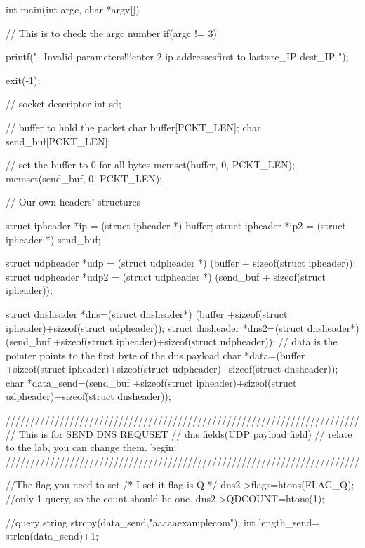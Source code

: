 \documentclass[a4paper,12pt]{article}
\begin{document}
		
		int main(int argc, char *argv[])
		{
		
		
		
		// This is to check the argc number
		    if(argc != 3){
		
		    	printf("- Invalid parameters!!!\nPlease enter 2 ip addresses\nFrom first to last:src_IP  dest_IP  \n");
		   
		    	exit(-1);
		
		    }
		
		
		// socket descriptor
		    int sd;
		
		// buffer to hold the packet
		    char buffer[PCKT_LEN];
		    char send_buf[PCKT_LEN];
		
		// set the buffer to 0 for all bytes
		    memset(buffer, 0, PCKT_LEN);
		    memset(send_buf, 0, PCKT_LEN);
		
		    // Our own headers' structures
		
		    struct ipheader *ip = (struct ipheader *) buffer;
		    struct ipheader *ip2 = (struct ipheader *) send_buf;
		
		    struct udpheader *udp = (struct udpheader *) (buffer + sizeof(struct ipheader));
		    struct udpheader *udp2 = (struct udpheader *) (send_buf + sizeof(struct ipheader));
		
		    struct dnsheader *dns=(struct dnsheader*) (buffer +sizeof(struct ipheader)+sizeof(struct udpheader));
		    struct dnsheader *dns2=(struct dnsheader*) (send_buf +sizeof(struct ipheader)+sizeof(struct udpheader));
		// data is the pointer points to the first byte of the dns payload  
		    char *data=(buffer +sizeof(struct ipheader)+sizeof(struct udpheader)+sizeof(struct dnsheader));
		    char *data_send=(send_buf +sizeof(struct ipheader)+sizeof(struct udpheader)+sizeof(struct dnsheader));
		
		
		
		
		////////////////////////////////////////////////////////////////////////
		// This is for SEND DNS REQUSET
		// dns fields(UDP payload field)
		// relate to the lab, you can change them. begin:
		////////////////////////////////////////////////////////////////////////
		
		//The flag you need to set
		/* I set it flag is Q */
		    dns2->flags=htons(FLAG_Q);
		//only 1 query, so the count should be one.
		    dns2->QDCOUNT=htons(1);
		
		
		
		
		
		
		//query string
		    strcpy(data_send,"\5aaaaa\7example\3com");
		    int length_send= strlen(data_send)+1;
		
}
\end{document}
